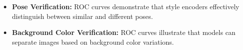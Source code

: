 \begin{itemize}
    \item \textbf{Pose Verification:} ROC curves demonstrate 
    that style encoders effectively distinguish between 
    similar and different poses.
    \item \textbf{Background Color Verification:} ROC curves 
    illustrate that models can separate images based 
    on background color variations.
\end{itemize}

